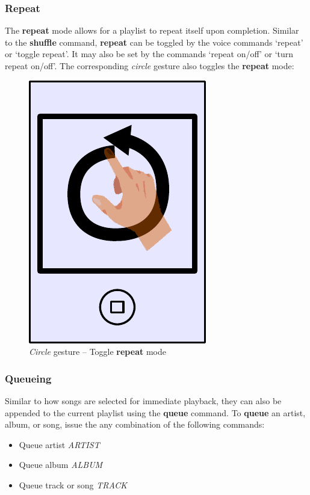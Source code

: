 \documentclass[12pt,letterpaper]{article}
\begin{document}
\subsubsection*{Repeat}

The \textbf{repeat} mode allows for a playlist to repeat itself upon completion. Similar to the \textbf{shuffle} command, \textbf{repeat} can be toggled by the voice commands `repeat' or `toggle repeat'. It may also be set by the commands `repeat on/off' or `turn repeat on/off'. {\color{blue} The corresponding \emph{circle} gesture also toggles the \textbf{repeat} mode}:
\begin{figure}[H]
	\centering
	\includegraphics[scale=0.6]{circle}
	\caption{\emph{Circle} gesture -- Toggle \textbf{repeat} mode}
\end{figure}

\subsubsection*{Queueing}

{\color{blue} Similar to how songs are selected for immediate playback, they can also be appended to the current playlist using the \textbf{queue} command}. To \textbf{queue} an artist, album, or song, issue the any combination of the following commands:
	\begin{itemize}
	\item Queue artist \textit{ARTIST}
	\item Queue album \textit{ALBUM}
	\item Queue track or song \textit{TRACK}
	\end{itemize}
\end{document}
